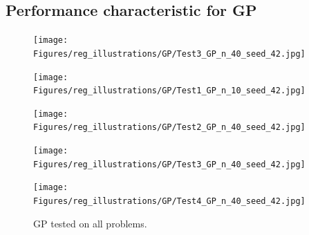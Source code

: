 \subsection{Performance characteristic for GP}
\begin{testexample}
    \begin{figure}[H]
        \texttt{[image: Figures/reg\_illustrations/GP/Test3\_GP\_n\_40\_seed\_42.jpg]}
    \end{figure}
\end{testexample}



\begin{figure}[H]
    \centering
    \begin{minipage}[b]{0.49\textwidth}
     \texttt{[image: Figures/reg\_illustrations/GP/Test1\_GP\_n\_10\_seed\_42.jpg]}
    \end{minipage}
    \hfill
    \begin{minipage}[b]{0.49\textwidth}
      \texttt{[image: Figures/reg\_illustrations/GP/Test2\_GP\_n\_40\_seed\_42.jpg]}
     \end{minipage}
\end{figure}

\begin{figure}[H]
    \begin{minipage}[b]{0.49\textwidth}
        \texttt{[image: Figures/reg\_illustrations/GP/Test3\_GP\_n\_40\_seed\_42.jpg]}
       \end{minipage}
       \hfill
       \begin{minipage}[b]{0.49\textwidth}
         \texttt{[image: Figures/reg\_illustrations/GP/Test4\_GP\_n\_40\_seed\_42.jpg]}
        \end{minipage}
        \caption{GP tested on all problems.}
\end{figure}
